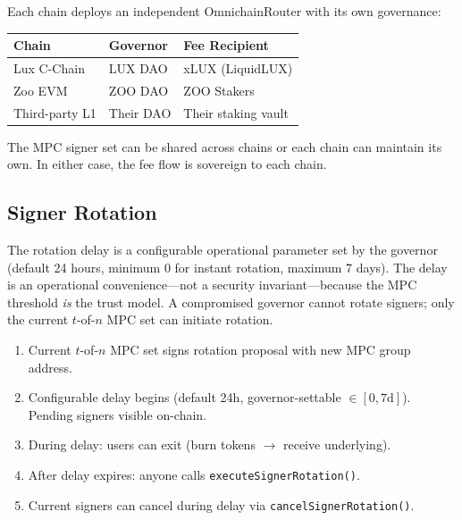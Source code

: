 Each chain deploys an independent OmnichainRouter with its own governance:

\begin{center}
\small
\begin{tabular}{lll}
\toprule
\textbf{Chain} & \textbf{Governor} & \textbf{Fee Recipient} \\
\midrule
Lux C-Chain & LUX DAO & xLUX (LiquidLUX) \\
Zoo EVM & ZOO DAO & ZOO Stakers \\
Third-party L1 & Their DAO & Their staking vault \\
\bottomrule
\end{tabular}
\end{center}

The MPC signer set can be shared across chains or each chain can maintain its own. In either case, the fee flow is sovereign to each chain.

\subsection{Signer Rotation}

The rotation delay is a configurable operational parameter set by the governor (default 24 hours, minimum 0 for instant rotation, maximum 7 days). The delay is an operational convenience---not a security invariant---because the MPC threshold \emph{is} the trust model. A compromised governor cannot rotate signers; only the current $t$-of-$n$ MPC set can initiate rotation.

\begin{enumerate}[nosep]
  \item Current $t$-of-$n$ MPC set signs rotation proposal with new MPC group address.
  \item Configurable delay begins (default 24h, governor-settable $\in [0, 7\text{d}]$). Pending signers visible on-chain.
  \item During delay: users can exit (burn tokens $\to$ receive underlying).
  \item After delay expires: anyone calls \texttt{executeSignerRotation()}.
  \item Current signers can cancel during delay via \texttt{cancelSignerRotation()}.
\end{enumerate}

